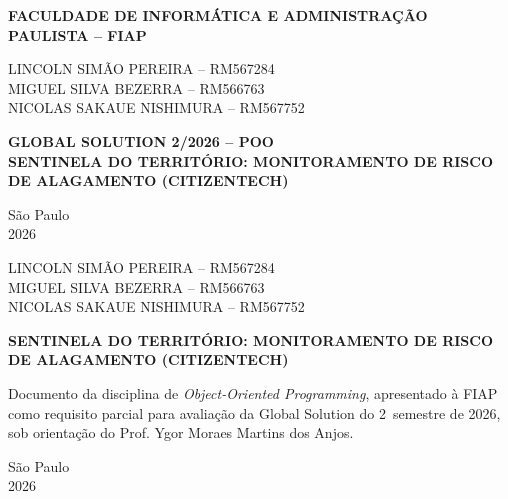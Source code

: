 \documentclass[12pt,a4paper]{article}
\begin{document}
\begin{titlepage}
\thispagestyle{empty}
\begin{center}
{\bfseries FACULDADE DE INFORMÁTICA E ADMINISTRAÇÃO PAULISTA -- FIAP}

\vspace{3cm}

LINCOLN SIMÃO PEREIRA -- RM567284\\
MIGUEL SILVA BEZERRA -- RM566763\\
NICOLAS SAKAUE NISHIMURA -- RM567752

\vspace{3.5cm}

{\bfseries\large GLOBAL SOLUTION 2\textordmasculine/2026 -- POO\\[0.3cm]
SENTINELA DO TERRITÓRIO: MONITORAMENTO DE RISCO DE ALAGAMENTO (CITIZENTECH)}

\vfill

São Paulo\\
2026
\end{center}
\end{titlepage}

\newpage
\thispagestyle{empty}
\begin{center}
LINCOLN SIMÃO PEREIRA -- RM567284\\
MIGUEL SILVA BEZERRA -- RM566763\\
NICOLAS SAKAUE NISHIMURA -- RM567752

\vspace{4cm}

{\bfseries\large SENTINELA DO TERRITÓRIO: MONITORAMENTO DE RISCO DE ALAGAMENTO (CITIZENTECH)}
\end{center}

\vspace{2cm}

\begin{flushright}
\begin{minipage}{0.55\textwidth}
\onehalfspacing\small
Documento da disciplina de \textit{Object-Oriented Programming}, apresentado à FIAP como requisito parcial para avaliação da Global Solution do 2\textordmasculine\ semestre de 2026, sob orientação do Prof. Ygor Moraes Martins dos Anjos.
\end{minipage}
\end{flushright}

\vfill
\begin{center}
São Paulo\\
2026
\end{center}
\end{document}
